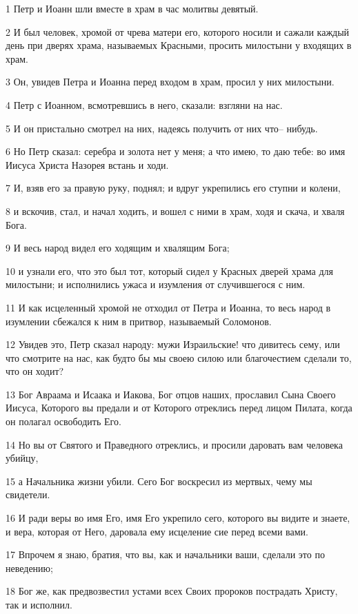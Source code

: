 \par 1 Петр и Иоанн шли вместе в храм в час молитвы девятый.
\par 2 И был человек, хромой от чрева матери его, которого носили и сажали каждый день при дверях храма, называемых Красными, просить милостыни у входящих в храм.
\par 3 Он, увидев Петра и Иоанна перед входом в храм, просил у них милостыни.
\par 4 Петр с Иоанном, всмотревшись в него, сказали: взгляни на нас.
\par 5 И он пристально смотрел на них, надеясь получить от них что-- нибудь.
\par 6 Но Петр сказал: серебра и золота нет у меня; а что имею, то даю тебе: во имя Иисуса Христа Назорея встань и ходи.
\par 7 И, взяв его за правую руку, поднял; и вдруг укрепились его ступни и колени,
\par 8 и вскочив, стал, и начал ходить, и вошел с ними в храм, ходя и скача, и хваля Бога.
\par 9 И весь народ видел его ходящим и хвалящим Бога;
\par 10 и узнали его, что это был тот, который сидел у Красных дверей храма для милостыни; и исполнились ужаса и изумления от случившегося с ним.
\par 11 И как исцеленный хромой не отходил от Петра и Иоанна, то весь народ в изумлении сбежался к ним в притвор, называемый Соломонов.
\par 12 Увидев это, Петр сказал народу: мужи Израильские! что дивитесь сему, или что смотрите на нас, как будто бы мы своею силою или благочестием сделали то, что он ходит?
\par 13 Бог Авраама и Исаака и Иакова, Бог отцов наших, прославил Сына Своего Иисуса, Которого вы предали и от Которого отреклись перед лицом Пилата, когда он полагал освободить Его.
\par 14 Но вы от Святого и Праведного отреклись, и просили даровать вам человека убийцу,
\par 15 а Начальника жизни убили. Сего Бог воскресил из мертвых, чему мы свидетели.
\par 16 И ради веры во имя Его, имя Его укрепило сего, которого вы видите и знаете, и вера, которая от Него, даровала ему исцеление сие перед всеми вами.
\par 17 Впрочем я знаю, братия, что вы, как и начальники ваши, сделали это по неведению;
\par 18 Бог же, как предвозвестил устами всех Своих пророков пострадать Христу, так и исполнил.
